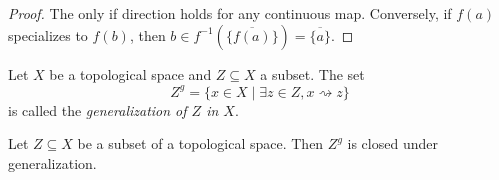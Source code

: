 \begin{proof}
    The only if direction holds for any continuous map. Conversely, if $f(a)$ specializes to $f(b)$, then
    $b \in f^{-1}(\overline{\{f(a)\}}) = \overline{\{a\} }$.
\end{proof}

\begin{definition}
    Let $X$ be a topological space and $Z \subseteq X$ a subset. The set
    \[
    Z^g = \{ x \in X \mid \exists z \in Z, x \rightsquigarrow z \}
    \] is called the \emph{generalization of $Z$ in $X$}.
    \label{def:generalization}
\end{definition}

\begin{lemma}
    Let $Z \subseteq X$ be a subset of a topological space. Then $Z^g$ is closed under generalization.
\end{lemma}

